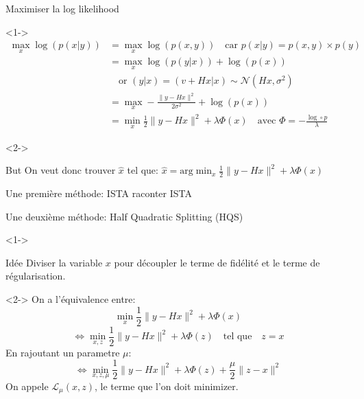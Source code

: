 \documentclass[11pt]{beamer}
\begin{document}
\begin{frame}{Maximiser la log likelihood}
    \begin{visibleenv}<1->
        \begin{align*}
            \max_x \log(p(x|y)) &= \max_x \log(p(x, y)) \quad \text{car } p(x|y) = p(x, y) \times p(y) \\
            &= \max_x \log(p(y|x)) + \log(p(x)) \\
            &\quad \text{or } (y|x) = (v+Hx|x) \sim \mathcal{N}(Hx, \sigma^2) \\
            &= \max_x -\frac{\lVert y-Hx \rVert ^2}{2 \sigma^2} + \log(p(x)) \\
            &= \min_x \frac{1}{2}\lVert y-Hx \rVert ^2 + \lambda \Phi(x) \quad \text{avec } \Phi = -\frac{\log \circ p}{\lambda}
        \end{align*}
    \end{visibleenv}

    \begin{visibleenv}<2->
        \begin{alertblock}{But}
            On veut donc trouver $\hat{x}$ tel que: $\hat{x} = \text{arg} \min_x \frac{1}{2} \lVert y-Hx \rVert ^2 + \lambda \Phi(x)$
        \end{alertblock}
    \end{visibleenv}
\end{frame}

\begin{frame}{Une première méthode: ISTA}
    raconter ISTA
\end{frame}

\begin{frame}{Une deuxième méthode: Half Quadratic Splitting (HQS)}
    \begin{visibleenv}<1->
        \begin{exampleblock}{Idée}
            Diviser la variable $x$ pour découpler le terme de fidélité et le terme de régularisation.
        \end{exampleblock}
    \end{visibleenv}
    \begin{visibleenv}<2->
        On a l'équivalence entre:
        $$ \min_x \frac{1}{2}\lVert y-Hx \rVert^2 + \lambda \Phi(x) $$
        $$ \Leftrightarrow \min_{x, z} \frac{1}{2}\lVert y-Hx \rVert ^2 + \lambda \Phi(z) \quad \text{tel que} \quad  z=x$$
        En rajoutant un parametre $\mu$:
        $$ \Leftrightarrow \min_{x, z, \mu}  \frac{1}{2}\lVert y-Hx \rVert ^2+\lambda \Phi(z) + \frac{\mu}{2}\lVert z-x \rVert ^2 $$
        On appele $\mathcal{L}_{\mu}(x,z)$, le terme que l'on doit minimizer.
    \end{visibleenv}
\end{frame}
\end{document}
